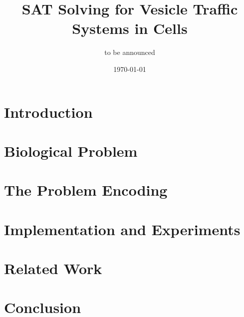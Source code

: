 \documentclass{llncs}
\begin{document}
\title{SAT Solving for Vesicle Traffic Systems in Cells}

\author{to be announced}

\date{\today}

\maketitle


\begin{abstract}

\end{abstract}

\section{Introduction}
\label{sec:intro}


\section{Biological Problem}
\label{sec:bio}
% 

\section{The Problem Encoding}
\label{sec:encoding}


\section{Implementation and Experiments}
\label{sec:experiments}


\section{Related Work}
\label{sec:related}


\section{Conclusion}
\label{sec:conclusion}





\end{document}
